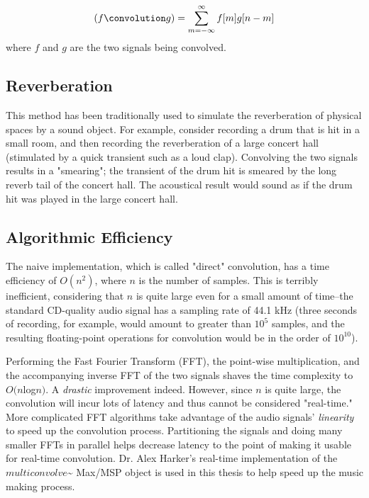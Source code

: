 \documentclass{article}
\begin{document}
		\begin{equation}
			(f \convolution g) = \sum_{m=-\infty}^{\infty} f[m] g[n-m] 
		\end{equation} 
		where $f$ and $g$ are the two signals being convolved.\cite{JOS_conv}  

		\subsection{Reverberation}

			This method has been traditionally used to simulate the reverberation of physical spaces by a sound object.  For example, consider recording a drum that is hit in a small room, and then recording the reverberation of a large concert hall (stimulated by a quick transient such as a loud clap).  Convolving the two signals results in a "smearing"; the transient of the drum hit is smeared by the long reverb tail of the concert hall. The acoustical result would sound as if the drum hit was played in the large concert hall.

		\subsection{Algorithmic Efficiency}

			The naive implementation, which is called "direct" convolution, has a time efficiency of $O(n^2)$, where $n$ is the number of samples. This is terribly inefficient, considering that $n$ is quite large even for a small amount of time--the standard CD-quality audio signal has a sampling rate of 44.1 kHz (three seconds of recording, for example, would amount to greater than $10^5$ samples, and the resulting floating-point operations for convolution would be in the order of $10^{10}$).  

			Performing the Fast Fourier Transform (FFT), the point-wise multiplication, and the accompanying inverse FFT of the two signals shaves the time complexity to $O(n$log$n)$. A \emph{drastic} improvement indeed.  However, since $n$ is quite large, the convolution will incur lots of latency and thus cannot be considered "real-time."  More complicated FFT algorithms take advantage of the audio signals' \emph{linearity} to speed up the convolution process. Partitioning the signals and doing many smaller FFTs in parallel helps decrease latency to the point of making it usable for real-time convolution.\cite{Batten_conv} Dr. Alex Harker's real-time implementation of the $multiconvolve$\~{} Max/MSP object is used in this thesis to help speed up the music making process.\cite{pa}
\end{document}
